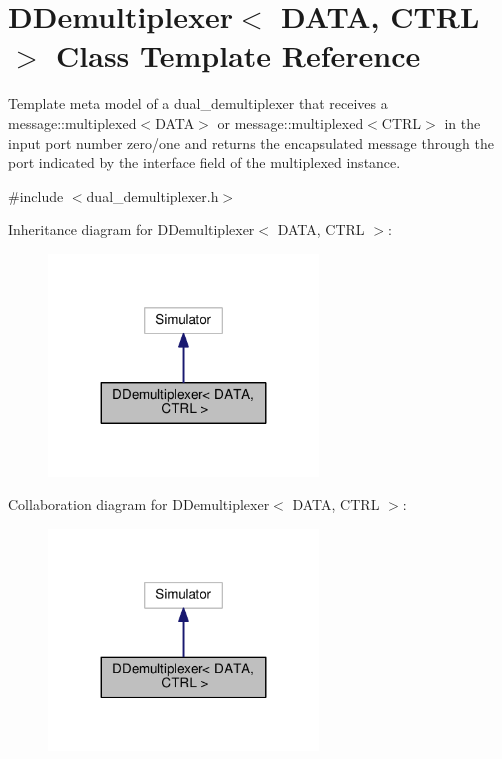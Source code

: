 \hypertarget{classDDemultiplexer}{}\section{D\+Demultiplexer$<$ D\+A\+TA, C\+T\+RL $>$ Class Template Reference}
\label{classDDemultiplexer}


Template meta model of a dual\+\_\+demultiplexer that receives a message\+::multiplexed$<$\+D\+A\+T\+A$>$ or message\+::multiplexed$<$\+C\+T\+R\+L$>$ in the input port number zero/one and returns the encapsulated message through the port indicated by the interface field of the multiplexed instance.  




{\ttfamily \#include $<$dual\+\_\+demultiplexer.\+h$>$}



Inheritance diagram for D\+Demultiplexer$<$ D\+A\+TA, C\+T\+RL $>$\+:\nopagebreak
\begin{figure}[H]
\begin{center}
\leavevmode
\includegraphics[width=203pt]{classDDemultiplexer__inherit__graph}
\end{center}
\end{figure}


Collaboration diagram for D\+Demultiplexer$<$ D\+A\+TA, C\+T\+RL $>$\+:\nopagebreak
\begin{figure}[H]
\begin{center}
\leavevmode
\includegraphics[width=203pt]{classDDemultiplexer__coll__graph}
\end{center}
\end{figure}
